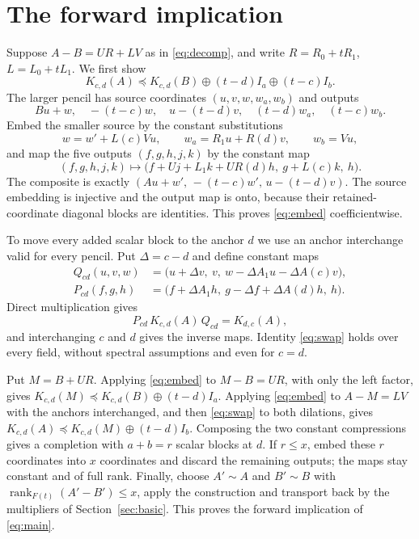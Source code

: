 \documentclass[11pt]{article}
\newcommand{\rk}{\operatorname{rank}}
\newcommand{\cmp}{\preceq}
\newcommand{\Ft}{F(t)}
\begin{document}
\section{The forward implication}\label{sec:forward}

Suppose $A-B=UR+LV$ as in \eqref{eq:decomp}, and write $R=R_0+tR_1$, $L=L_0+tL_1$. We first show
\begin{equation}\label{eq:embed}
K_{c,d}(A)\cmp K_{c,d}(B)\oplus(t-d)I_a\oplus(t-c)I_b .
\end{equation}
The larger pencil has source coordinates $(u,v,w,w_a,w_b)$ and outputs
\[
Bu+w,\quad -(t-c)w,\quad u-(t-d)v,\quad (t-d)w_a,\quad (t-c)w_b .
\]
Embed the smaller source by the constant substitutions
\[
w=w'+L(c)Vu,\qquad w_a=R_1u+R(d)v,\qquad w_b=Vu,
\]
and map the five outputs $(f,g,h,j,k)$ by the constant map
\[
(f,g,h,j,k)\longmapsto\bigl(f+Uj+L_1k+UR(d)h,\ g+L(c)k,\ h\bigr).
\]
The composite is exactly $(Au+w',\,-(t-c)w',\,u-(t-d)v)$. The source embedding is injective and the output map is onto, because their retained-coordinate diagonal blocks are identities. This proves \eqref{eq:embed} coefficientwise.

To move every added scalar block to the anchor $d$ we use an anchor interchange valid for every pencil. Put $\Delta=c-d$ and define constant maps
\begin{align*}
Q_{cd}(u,v,w)&=\bigl(u+\Delta v,\ v,\ w-\Delta A_1u-\Delta A(c)v\bigr),\\
P_{cd}(f,g,h)&=\bigl(f+\Delta A_1h,\ g-\Delta f+\Delta A(d)h,\ h\bigr).
\end{align*}
Direct multiplication gives
\begin{equation}\label{eq:swap}
P_{cd}\,K_{c,d}(A)\,Q_{cd}=K_{d,c}(A),
\end{equation}
and interchanging $c$ and $d$ gives the inverse maps. Identity \eqref{eq:swap} holds over every field, without spectral assumptions and even for $c=d$.

Put $M=B+UR$. Applying \eqref{eq:embed} to $M-B=UR$, with only the left factor, gives $K_{c,d}(M)\cmp K_{c,d}(B)\oplus(t-d)I_a$. Applying \eqref{eq:embed} to $A-M=LV$ with the anchors interchanged, and then \eqref{eq:swap} to both dilations, gives $K_{c,d}(A)\cmp K_{c,d}(M)\oplus(t-d)I_b$. Composing the two constant compressions gives a completion with $a+b=r$ scalar blocks at $d$. If $r\le x$, embed these $r$ coordinates into $x$ coordinates and discard the remaining outputs; the maps stay constant and of full rank. Finally, choose $A'\sim A$ and $B'\sim B$ with $\rk_{\Ft}(A'-B')\le x$, apply the construction and transport back by the multipliers of Section~\ref{sec:basic}. This proves the forward implication of \eqref{eq:main}.
\end{document}
